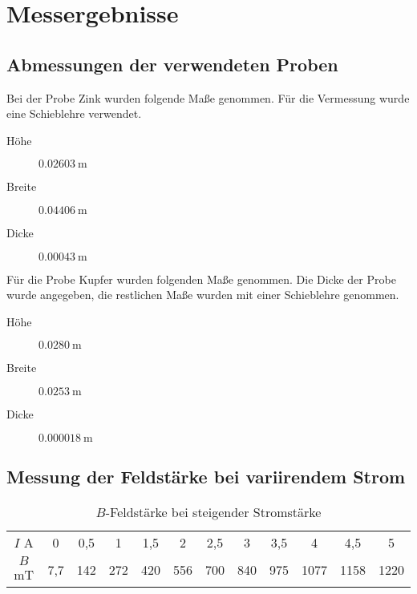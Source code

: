 \section{Messergebnisse}

\subsection{Abmessungen der verwendeten Proben}

Bei der Probe Zink wurden folgende Maße genommen.
Für die Vermessung wurde eine Schieblehre verwendet.

\begin{description}
  \item[Höhe] $\SI{0,02603}{\meter}$
  \item[Breite] $\SI{0,04406}{\meter}$
  \item[Dicke] $\SI{0,00043}{\meter}$
\end{description}

Für die Probe Kupfer wurden folgenden Maße genommen.
Die Dicke der Probe wurde angegeben, die restlichen Maße wurden mit einer
Schieblehre genommen.

\begin{description}
  \item[Höhe] $\SI{0,0280}{\meter}$
  \item[Breite] $\SI{0,0253}{\meter}$
  \item[Dicke] $\SI{0,000018}{\meter}$
\end{description}

\subsection{Messung der Feldstärke bei variirendem Strom}

\begin{table}
 \centering
 \begin{tabular}[width=\textwidth]{S| S[table-format=1.1] S[table-format=3.1] S[table-format=3.0] S[table-format=3.1] S[table-format=3.0] S[table-format=3.1] S[table-format=3.0] S[table-format=3.1] S[table-format=4.0] S[table-format=4.1] S[table-format=4.0]}
     \midrule
      $I$  \si{\ampere} & 0 & 0,5 & 1 & 1,5 & 2 & 2,5 & 3 & 3,5 & 4 & 4,5 & 5 \\
      $B$  \si{\milli\tesla} & 7,7 & 142 & 272 & 420 & 556 & 700 & 840 & 975 & 1077 & 1158 & 1220 \\
      \bottomrule
\end{tabular}
  \caption{$B$-Feldstärke bei steigender Stromstärke}
  \label{tab:Messergebnisse_Feldstärke_Isteigt}
\end{table}


